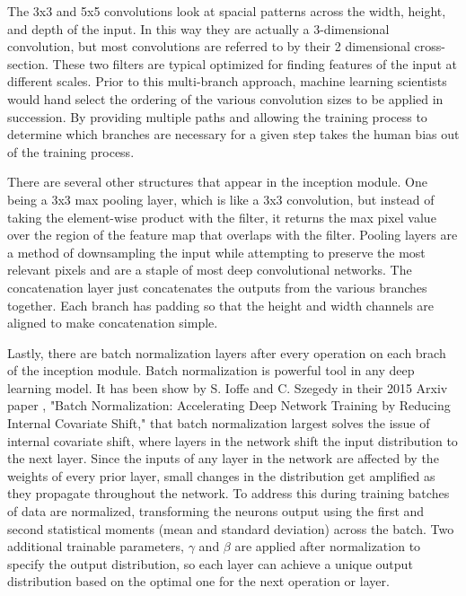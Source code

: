 The 3x3 and 5x5 convolutions look at spacial patterns across the width, height, and depth of the input. In this way they are actually a 3-dimensional convolution, but most convolutions are referred to by their 2 dimensional cross-section. These two filters are typical optimized for finding features of the input at different scales. Prior to this multi-branch approach, machine learning scientists would hand select the ordering of the various convolution sizes to be applied in succession. By providing multiple paths and allowing the training process to determine which branches are necessary for a given step takes the human bias out of the training process.

There are several other structures that appear in the inception module. One being a 3x3 max pooling layer, which is like a 3x3 convolution, but instead of taking the element-wise product with the filter, it returns the max pixel value over the region of the feature map that overlaps with the filter. Pooling layers are a method of downsampling the input while attempting to preserve the most relevant pixels and are a staple of most deep convolutional networks. The concatenation layer just concatenates the outputs from the various branches together. Each branch has padding so that the height and width channels are aligned to make concatenation simple.

Lastly, there are batch normalization layers after every operation on each brach of the inception module. Batch normalization is powerful tool in any deep learning model. It has been show by S. Ioffe and C. Szegedy in their 2015 Arxiv paper \cite{https://doi.org/10.48550/arxiv.1502.03167}, "Batch Normalization: Accelerating Deep Network Training by Reducing Internal Covariate Shift," that batch normalization largest solves the issue of internal covariate shift, where layers in the network shift the input distribution to the next layer. Since the inputs of any layer in the network are affected by the weights of every prior layer, small changes in the distribution get amplified as they propagate throughout the network. To address this during training batches of data are normalized, transforming the neurons output using the first and second statistical moments (mean and standard deviation) across the batch. Two additional trainable parameters, $\gamma$ and $\beta$ are applied after normalization to specify the output distribution, so each layer can achieve a unique output distribution based on the optimal one for the next operation or layer.

